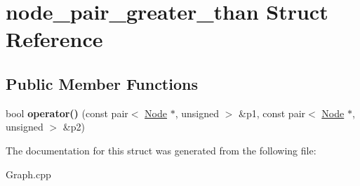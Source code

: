 \hypertarget{structnode__pair__greater__than}{}\section{node\+\_\+pair\+\_\+greater\+\_\+than Struct Reference}
\label{structnode__pair__greater__than}
\subsection*{Public Member Functions}
\begin{DoxyCompactItemize}
\item 
\hypertarget{structnode__pair__greater__than_aefc537db2afdf9b3b89469adaaeea00b}{}\label{structnode__pair__greater__than_aefc537db2afdf9b3b89469adaaeea00b} 
bool {\bfseries operator()} (const pair$<$ \hyperlink{class_node}{Node} $\ast$, unsigned $>$ \&p1, const pair$<$ \hyperlink{class_node}{Node} $\ast$, unsigned $>$ \&p2)
\end{DoxyCompactItemize}


The documentation for this struct was generated from the following file\+:\begin{DoxyCompactItemize}
\item 
Graph.\+cpp\end{DoxyCompactItemize}
